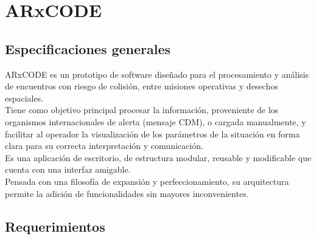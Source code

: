 \chapter{ARxCODE}
\label{chap:arxcode} 

\section{Especificaciones generales}

ARxCODE es un prototipo de software dise\~nado para el procesamiento y an\'alisis de encuentros con riesgo de colisi\'on, entre misiones operativas y desechos espaciales.\\
Tiene como objetivo principal procesar la informaci\'on, proveniente de los organismos internacionales de alerta (mensaje CDM), o cargada manualmente, y facilitar al operador la visualizaci\'on de los par\'ametros de la situaci\'on en forma clara para su correcta interpretaci\'on y comunicaci\'on.\\
Es una aplicaci\'on de escritorio, de estructura modular, reusable y modificable que cuenta con una interfaz amigable.\\
Pensada con una filosof\'ia de expansi\'on y perfeccionamiento, su arquitectura permite la adici\'on de funcionalidades sin mayores inconvenientes.\\


\section{Requerimientos}\label{sec:requerimientos}


